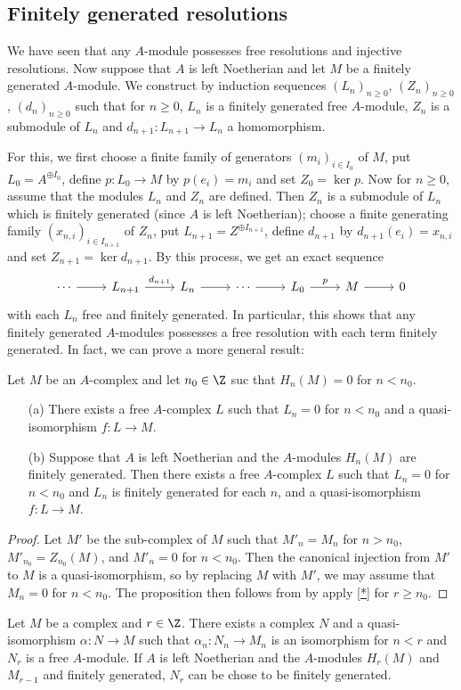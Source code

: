 \subsection{Finitely generated resolutions}
We have seen that any $A$-module possesses free resolutions and injective resolutions. Now suppose that $A$ is left Noetherian and let $M$ be a finitely generated $A$-module. We construct by induction sequences $(L_n)_{n\geq 0}$, $(Z_n)_{n\geq 0}$, $(d_n)_{n\geq 0}$ such that for $n\geq 0$, $L_n$ is a finitely generated free $A$-module, $Z_n$ is a submodule of $L_n$ and $d_{n+1}:L_{n+1}\to L_n$ a homomorphism.\par
For this, we first choose a finite family of generators $(m_i)_{i\in I_0}$ of $M$, put $L_0=A^{\oplus I_0}$, define $p:L_0\to M$ by $p(e_i)=m_i$ and set $Z_0=\ker p$. Now for $n\geq 0$, assume that the modules $L_n$ and $Z_n$ are defined. Then $Z_n$ is a submodule of $L_n$ which is finitely generated (since $A$ is left Noetherian); choose a finite generating family $(x_{n,i})_{i\in I_{n+1}}$ of $Z_n$, put $L_{n+1}=Z^{\oplus I_{n+1}}$, define $d_{n+1}$ by $d_{n+1}(e_i)=x_{n,i}$ and set $Z_{n+1}=\ker d_{n+1}$. By this process, we get an exact sequence
\[\begin{tikzcd}
\cdots\ar[r]&L_{n+1}\ar[r,"d_{n+1}"]&L_n\ar[r]&\cdots\ar[r]&L_0\ar[r,"p"]&M\ar[r]&0
\end{tikzcd}\]
with each $L_n$ free and finitely generated. In particular, this shows that any finitely generated $A$-modules possesses a free resolution with each term finitely generated. In fact, we can prove a more general result:
\begin{proposition}\label{module complex finite resolution for complex}
Let $M$ be an $A$-complex and let $n_0\in\Z$ suc that $H_n(M)=0$ for $n<n_0$.
\begin{itemize}
\item[(a)] There exists a free $A$-complex $L$ such that $L_n=0$ for $n<n_0$ and a quasi-isomorphism $f:L\to M$.
\item[(b)] Suppose that $A$ is left Noetherian and the $A$-modules $H_n(M)$ are finitely generated. Then there exists a free $A$-complex $L$ such that $L_n=0$ for $n<n_0$ and $L_n$ is finitely generated for each $n$, and a quasi-isomorphism $f:L\to M$.
\end{itemize}
\end{proposition}
\begin{proof}
Let $M'$ be the sub-complex of $M$ such that $M'_n=M_n$ for $n>n_0$, $M'_{n_0}=Z_{n_0}(M)$, and $M'_n=0$ for $n<n_0$. Then the canonical injection from $M'$ to $M$ is a quasi-isomorphism, so by replacing $M$ with $M'$, we may assume that $M_n=0$ for $n<n_0$. The proposition then follows from by apply \cref{*} for $r\geq n_0$.
\end{proof}
\begin{lemma}
Let $M$ be a complex and $r\in\Z$. There exists a complex $N$ and a quasi-isomorphism $\alpha:N\to M$ such that $\alpha_n:N_n\to M_n$ is an isomorphism for $n<r$ and $N_r$ is a free $A$-module. If $A$ is left Noetherian and the $A$-modules $H_r(M)$ and $M_{r-1}$ and finitely generated, $N_r$ can be chose to be finitely generated.
\end{lemma}

